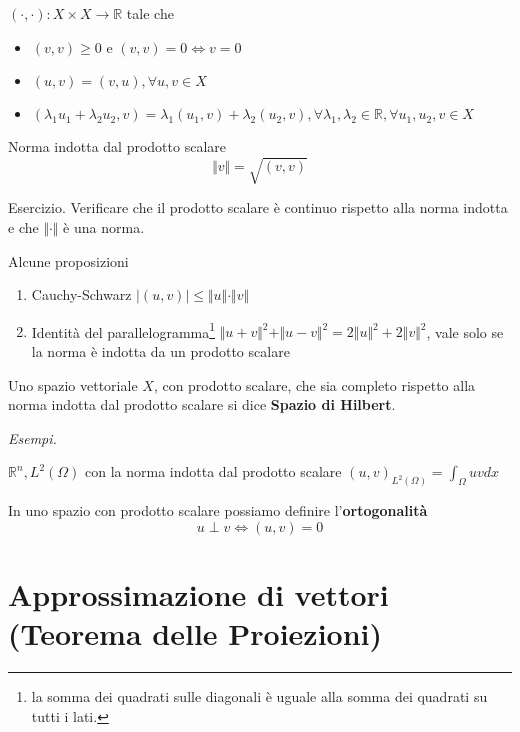 \documentclass[10pt,a4paper,twoside,openright]{book}
\begin{document}
\begin{definition}
	 $(\cdotp,\cdotp) :X\times X\rightarrow \mathbb{R}$ tale che
	\begin{itemize}
		\item $(v,v) \geqslant 0$ e $(v,v) =0\Leftrightarrow v=0$
		\item $(u,v) =(v,u),\forall u,v\in X$
		\item $( \lambda _{1} u_{1} +\lambda _{2} u_{2},v) =\lambda _{1}(u_{1},v) +\lambda _{2}(u_{2},v),\forall \lambda _{1},\lambda _{2} \in \mathbb{R},\forall u_{1},u_{2},v\in X$
	\end{itemize}
\end{definition}
\begin{definition}
	Norma indotta dal prodotto scalare
	\begin{equation*}
		\Vert v\Vert =\sqrt{(v,v)}
	\end{equation*}
\end{definition}
Esercizio. Verificare che il prodotto scalare è continuo rispetto alla norma indotta e che $\Vert \cdotp \Vert $ è una norma.
\begin{theorem}
	Alcune proposizioni
	\begin{enumerate}
		\item Cauchy-Schwarz $| (u,v)| \leqslant \Vert u\Vert \cdotp \Vert v\Vert $
		\item Identità del parallelogramma\footnote{la somma dei quadrati sulle diagonali è uguale alla somma dei quadrati su tutti i lati.} $\Vert u+v\Vert ^{2} +\Vert u-v\Vert ^{2} =2\Vert u\Vert ^{2} +2\Vert v\Vert ^{2}$, vale solo se la norma è indotta da un prodotto scalare
	\end{enumerate}
\end{theorem}
\begin{definition}
	Uno spazio vettoriale $X$, con prodotto scalare, che sia completo rispetto alla norma indotta dal prodotto scalare si dice \textbf{Spazio di Hilbert}.
\end{definition}
\textit{Esempi.}

$\mathbb{R}^{n},L^{2}(\Omega)$ con la norma indotta dal prodotto scalare $(u,v)_{L^{2}(\Omega)} =\int _{\Omega } uvdx$

In uno spazio con prodotto scalare possiamo definire l'\textbf{ortogonalità}
\begin{equation*}
	u\perp v\Leftrightarrow (u,v) =0
\end{equation*}
\section{Approssimazione di vettori (Teorema delle Proiezioni)}
\end{document}
